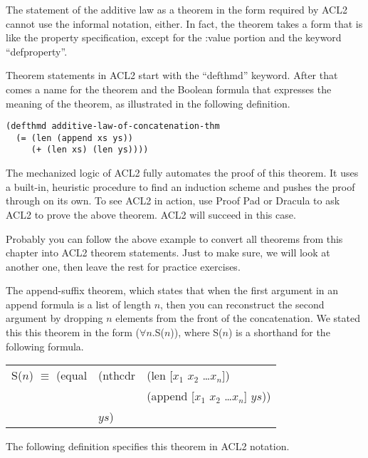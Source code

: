 The statement of the additive law as a theorem in the form
required by ACL2 cannot use the informal notation, either.
In fact, the theorem takes a form that is like the property specification,
except for the :value portion and the keyword ``defproperty''.

Theorem statements in ACL2 start with the ``defthmd'' keyword.
After that comes a name for the theorem and the Boolean formula
that expresses the meaning of the theorem, as illustrated in the following definition.

\begin{Verbatim}
(defthmd additive-law-of-concatenation-thm
  (= (len (append xs ys))
     (+ (len xs) (len ys))))
\end{Verbatim}

The mechanized logic of ACL2 fully automates the proof of this theorem.
It uses a built-in, heuristic procedure to find an induction scheme
and pushes the proof through on its own.
To see ACL2 in action, use Proof Pad or Dracula to ask ACL2
to prove the above theorem. ACL2 will succeed in this case.

Probably you can follow the above example to convert all theorems
from this chapter into ACL2 theorem statements.
Just to make sure, we will look at another one,
then leave the rest for practice exercises.

The append-suffix theorem, which states that
when the first argument in an append formula is a list of length $n$,
then you can reconstruct the second argument by dropping $n$ elements
from the front of the concatenation.
We stated this this theorem in the form ($\forall$$n$.S($n$)),
where S($n$) is a shorthand for the following formula.

\begin{samepage}
\begin{center}
\begin{tabular}{lll}
S($n$) $\equiv$ (equal & (nthcdr & (len [$x_1$ $x_2$ \dots $x_n$])          \\
                       &         & (append [$x_1$ $x_2$ \dots $x_n$] $ys$)) \\
                       & $ys$)   &                                          \\
\end{tabular}
\end{center}
\end{samepage}

The following definition specifies this theorem in ACL2 notation.

